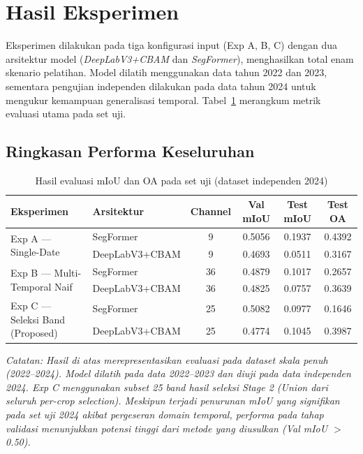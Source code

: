 
\section{Hasil Eksperimen}

Eksperimen dilakukan pada tiga konfigurasi input (Exp A, B, C) dengan dua arsitektur model
(\textit{DeepLabV3+CBAM} dan \textit{SegFormer}), menghasilkan total enam skenario pelatihan.
Model dilatih menggunakan data tahun 2022 dan 2023, sementara pengujian independen dilakukan 
pada data tahun 2024 untuk mengukur kemampuan generalisasi temporal.
Tabel~\ref{tab:hasil_utama} merangkum metrik evaluasi utama pada set uji.

\subsection{Ringkasan Performa Keseluruhan}

\begin{table}[H]
    \centering
    \caption{Hasil evaluasi mIoU dan OA pada set uji (dataset independen 2024)}
    \label{tab:hasil_utama}
    \begin{tabular}{|l|l|c|c|c|c|}
    \hline
    \textbf{Eksperimen} & \textbf{Arsitektur} & \textbf{Channel} & \textbf{Val mIoU} & \textbf{Test mIoU} & \textbf{Test OA} \\
    \hline
    \multirow{2}{*}{Exp A --- Single-Date} & SegFormer        & 9  & 0.5056 & 0.1937 & 0.4392 \\
                                          & DeepLabV3+CBAM   & 9  & 0.4693 & 0.0511 & 0.3167 \\
    \hline
    \multirow{2}{*}{Exp B --- Multi-Temporal Naif} & SegFormer & 36 & 0.4879 & 0.1017 & 0.2657 \\
                                                  & DeepLabV3+CBAM & 36 & 0.4825 & 0.0757 & 0.3639 \\
    \hline
    \multirow{2}{*}{Exp C --- Seleksi Band (Proposed)} & SegFormer       & 25 & 0.5082 & 0.0977 & 0.1646 \\
                                           & DeepLabV3+CBAM  & 25 & 0.4774 & 0.1045 & 0.3987 \\
    \hline
    \end{tabular}
\end{table}

\textit{Catatan: Hasil di atas merepresentasikan evaluasi pada dataset skala penuh (2022--2024). 
Model dilatih pada data 2022--2023 dan diuji pada data independen 2024. 
Exp C menggunakan subset 25 band hasil seleksi Stage 2 (Union dari seluruh per-crop selection). 
Meskipun terjadi penurunan mIoU yang signifikan pada set uji 2024 akibat pergeseran domain temporal, 
performa pada tahap validasi menunjukkan potensi tinggi dari metode yang diusulkan (Val mIoU $>$ 0.50).}

